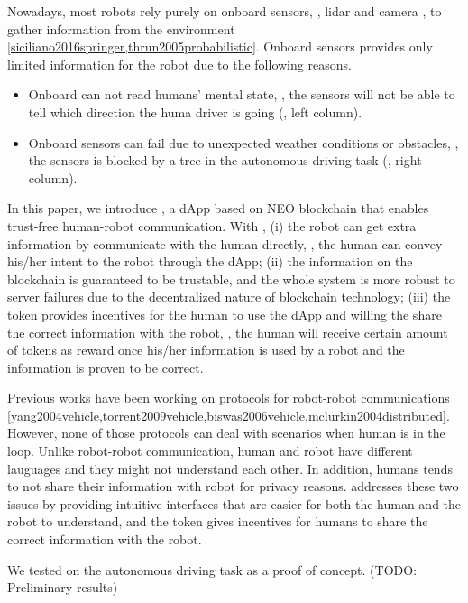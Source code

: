 \documentclass{article}
\begin{document}
Nowadays, most robots rely purely on onboard sensors,
\eg, lidar and camera \etc,
to gather information from the environment
\cref{siciliano2016springer,thrun2005probabilistic}. 
Onboard sensors provides only limited information for the
robot due to the following reasons.
\begin{itemize}
    \item Onboard can not read humans' mental 
        state, \eg, the sensors will not be able to tell 
        which direction the huma driver is going
        (, left column).
    \item Onboard sensors can fail due to unexpected weather
        conditions or obstacles, \eg, the sensors is blocked
        by a tree in the autonomous driving task
        (, right column).
\end{itemize}


In this paper, we introduce \nrc, a dApp based 
on NEO blockchain that enables trust-free human-robot 
communication.
With \nrc, (i) the robot can get extra information
by communicate with the human directly, 
\eg, the human can convey his/her intent to the robot 
through the \nrc dApp; 
(ii) the information on the blockchain is guaranteed to
be trustable, and the whole system is more robust to server
failures due to the decentralized nature of blockchain
technology; (iii) the \nrc token provides incentives
for the human to use the dApp and willing the share the
correct information with the robot, \ie, the human will receive
certain amount of tokens as reward once his/her information
is used by a robot and the information is proven to be correct.


Previous works have been working on 
protocols for robot-robot communications 
\cref{yang2004vehicle,torrent2009vehicle,biswas2006vehicle,mclurkin2004distributed}. 
However, none of those protocols can deal with scenarios
when human is in the loop.
Unlike robot-robot communication, human and robot 
have different lauguages and they might not understand
each other. In addition, humans tends to not share their
information with robot for privacy reasons.
\nrc addresses these two issues by providing intuitive
interfaces that are easier for both the human and the robot
to understand, and the \nrc token gives incentives for humans to
share the correct information with the robot.


We tested \nrc on the autonomous driving task as a proof of
concept.
(TODO: Preliminary results)
\end{document}
